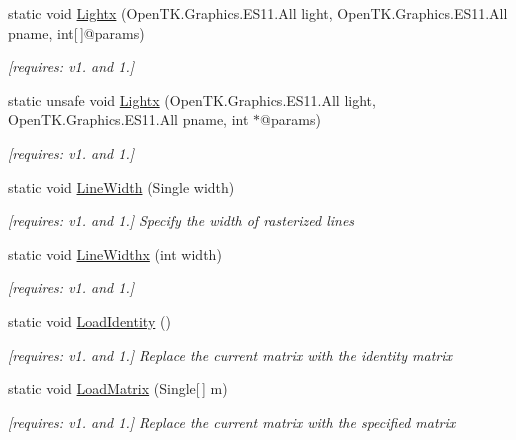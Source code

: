 \begin{DoxyCompactItemize}
static void \hyperlink{class_open_t_k_1_1_graphics_1_1_e_s11_1_1_g_l_aa66bd8ccc6514570d6ba0db5be834526}{Lightx} (Open\-T\-K.\-Graphics.\-E\-S11.\-All light, Open\-T\-K.\-Graphics.\-E\-S11.\-All pname, int\mbox{[}$\,$\mbox{]}@params)
\begin{DoxyCompactList}\small\item\em \mbox{[}requires\-: v1. and 1.\mbox{]}\end{DoxyCompactList}\item 
static unsafe void \hyperlink{class_open_t_k_1_1_graphics_1_1_e_s11_1_1_g_l_ad4c08c68e6c3fc70da5ced3dcbd26b6a}{Lightx} (Open\-T\-K.\-Graphics.\-E\-S11.\-All light, Open\-T\-K.\-Graphics.\-E\-S11.\-All pname, int $\ast$@params)
\begin{DoxyCompactList}\small\item\em \mbox{[}requires\-: v1. and 1.\mbox{]}\end{DoxyCompactList}\item 
static void \hyperlink{class_open_t_k_1_1_graphics_1_1_e_s11_1_1_g_l_a3e2b3f329b53846022f94d43079293ad}{Line\-Width} (Single width)
\begin{DoxyCompactList}\small\item\em \mbox{[}requires\-: v1. and 1.\mbox{]} Specify the width of rasterized lines \end{DoxyCompactList}\item 
static void \hyperlink{class_open_t_k_1_1_graphics_1_1_e_s11_1_1_g_l_ac3edaaa59169c882c2a7040e92988ee9}{Line\-Widthx} (int width)
\begin{DoxyCompactList}\small\item\em \mbox{[}requires\-: v1. and 1.\mbox{]}\end{DoxyCompactList}\item 
static void \hyperlink{class_open_t_k_1_1_graphics_1_1_e_s11_1_1_g_l_aa779051b660e16af936e080803e66f47}{Load\-Identity} ()
\begin{DoxyCompactList}\small\item\em \mbox{[}requires\-: v1. and 1.\mbox{]} Replace the current matrix with the identity matrix \end{DoxyCompactList}\item 
static void \hyperlink{class_open_t_k_1_1_graphics_1_1_e_s11_1_1_g_l_ab08f31b1b41ef8016f6cc3c865dc80fb}{Load\-Matrix} (Single\mbox{[}$\,$\mbox{]} m)
\begin{DoxyCompactList}\small\item\em \mbox{[}requires\-: v1. and 1.\mbox{]} Replace the current matrix with the specified matrix \end{DoxyCompactList}\item 

\end{DoxyCompactItemize}
